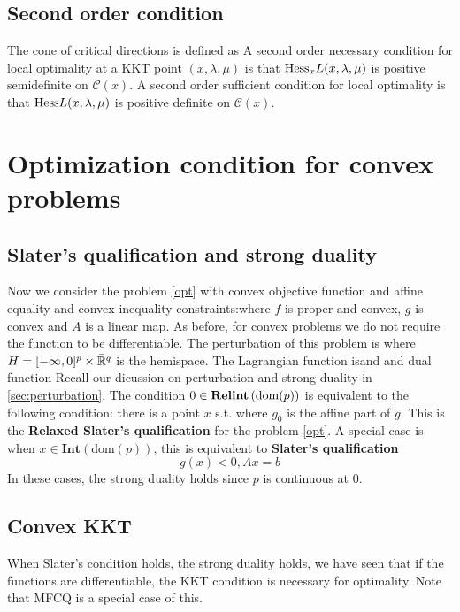 \documentclass[a4paper]{mynotes}
\def\dom{\text{dom}}
\def\ri{\mathbf{Relint}}
\begin{document}
\subsection{
    Second order condition
}
The cone of critical directions is defined as  A second order necessary condition for local optimality at a KKT point $(x,\lambda,\mu)$ is that $\mathrm{Hess}_x L(x,\lambda,\mu)$ is positive semidefinite on $\mathcal{C}(x)$. A second order sufficient condition for local optimality is that $\mathrm{Hess} L(x,\lambda,\mu)$ is positive definite on $\mathcal{C}(x)$.


\section{Optimization condition for convex problems}
\subsection{Slater's qualification and strong duality}


Now we consider the problem \ref{opt} with convex objective function and affine equality and convex inequality constraints:where $f$ is proper and convex, $g$ is convex and $A$ is a linear map. As before, for convex problems we do not require the function to be differentiable. The perturbation of this problem is  where $H=[-\infty,0]^p\times \bar{\mathbb{R}}^q$ is the hemispace. The Lagrangian function isand
and dual function
 Recall our dicussion on perturbation and strong duality in \ref{sec:perturbation}. The condition $0\in \ri\yk{\text{dom}(p)} $ is equivalent to the following condition: there is a point $x$ s.t.  where $g_0$ is the affine part of $g$. This is the \textbf{Relaxed Slater's qualification} for the problem \ref{opt}. 
A special case is when $x\in \mathbf{Int}(\dom(p))$, this is equivalent to \textbf{Slater's qualification} $$  g(x)<0,Ax=b  $$ 
 In these cases, the strong duality holds since $p$ is continuous at $0$.


\subsection{Convex KKT}
When Slater's condition holds, the strong duality holds, we have seen that if the functions are differentiable, the KKT condition is necessary for optimality. Note that MFCQ is a special case of this.
\end{document}
